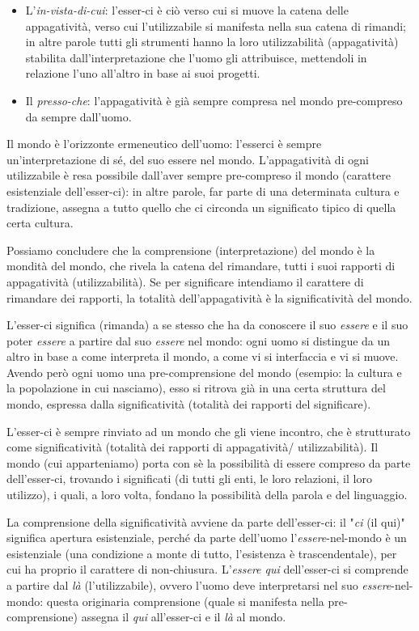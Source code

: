 \documentclass[a4paper,12pt,oneside]{article}%
\begin{document}
\begin{itemize}
	\item L'\textit{in-vista-di-cui}: l'esser-ci è ciò verso cui si muove la catena delle appagatività, verso cui l'utilizzabile si manifesta nella sua catena di rimandi; in altre parole tutti gli strumenti hanno la loro utilizzabilità (appagatività) stabilita dall'interpretazione che l'uomo gli attribuisce, mettendoli in relazione l'uno all'altro in base ai suoi progetti.
	\item Il \textit{presso-che}: l'appagatività è già sempre compresa nel mondo pre-compreso da sempre dall'uomo.
\end{itemize} 

Il mondo è l'orizzonte ermeneutico dell'uomo: l'esserci è sempre un'interpretazione di sé, del suo essere nel mondo. L'appagatività di ogni utilizzabile è resa possibile dall'aver sempre pre-compreso il mondo (carattere esistenziale dell'esser-ci): in altre parole, far parte di una determinata cultura e tradizione, assegna a tutto quello che ci circonda un significato tipico di quella certa cultura.

Possiamo concludere che la comprensione (interpretazione) del mondo è la mondità del mondo, che rivela la catena del rimandare, tutti i suoi rapporti di appagatività (utilizzabilità). Se per significare intendiamo il carattere di rimandare dei rapporti, la totalità dell'appagatività è la significatività del mondo.

L'esser-ci significa (rimanda) a se stesso che ha da conoscere il suo \textit{essere} e il suo poter \textit{essere} a partire dal suo \textit{essere} nel mondo: ogni uomo si distingue da un altro in base a come interpreta il mondo, a come vi si interfaccia e vi si muove. Avendo però ogni uomo una pre-comprensione del mondo (esempio: la cultura e la popolazione in cui nasciamo), esso si ritrova già in una certa struttura del mondo, espressa dalla significatività (totalità dei rapporti del significare).

L'esser-ci è sempre rinviato ad un mondo che gli viene incontro, che è strutturato come significatività (totalità dei rapporti di appagatività/ utilizzabilità). Il mondo (cui apparteniamo) porta con sè la possibilità di essere compreso da parte dell'esser-ci, trovando i significati (di tutti gli enti, le loro relazioni, il loro utilizzo), i quali, a loro volta, fondano la possibilità della parola e del linguaggio.

La comprensione della significatività avviene da parte dell'esser-ci: il "\textit{ci} (il qui)" significa apertura esistenziale, perché da parte dell'uomo l'\textit{essere}-nel-mondo è un esistenziale (una condizione a monte di tutto, l'esistenza è trascendentale), per cui ha proprio il carattere di non-chiusura. L'\textit{essere qui} dell'esser-ci si comprende a partire dal \textit{là} (l'utilizzabile), ovvero l'uomo deve interpretarsi nel suo \textit{essere}-nel-mondo: questa originaria comprensione (quale si manifesta nella pre-comprensione) assegna il \textit{qui} all'esser-ci e il \textit{là} al mondo.
\end{document}
